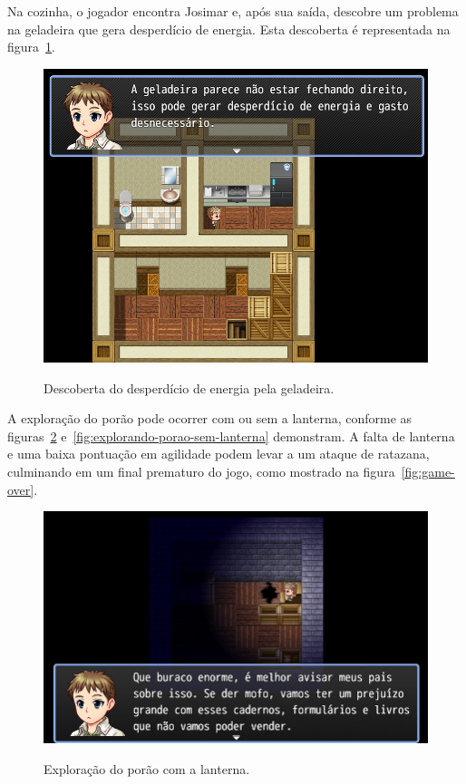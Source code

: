 Na cozinha, o jogador encontra Josimar e, após sua saída, descobre um problema na geladeira que gera desperdício de energia. Esta descoberta é representada na figura~\ref{fig:desperdicio-geladeira}.

\begin{figure}[!htbp]
	\centering
	\caption{Descoberta do desperdício de energia pela geladeira.}
	\includegraphics[scale=0.45]{Textuais/Pictures/desperdicio-geladeira.png}
	\label{fig:desperdicio-geladeira}
\end{figure}

A exploração do porão pode ocorrer com ou sem a lanterna, conforme as figuras~\ref{fig:explorando-porao-com-lanterna} e~\ref{fig:explorando-porao-sem-lanterna} demonstram. A falta de lanterna e uma baixa pontuação em agilidade podem levar a um ataque de ratazana, culminando em um final prematuro do jogo, como mostrado na figura~\ref{fig:game-over}.

\begin{figure}[!htbp]
	\centering
	\caption{Exploração do porão com a lanterna.}
	\includegraphics[scale=0.55]{Textuais/Pictures/explorando-porao-com-lanterna.png}
	\label{fig:explorando-porao-com-lanterna}
\end{figure}


